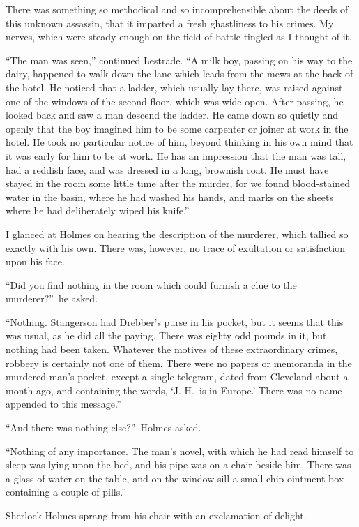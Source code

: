 \documentclass[12pt,english,oneside]{book}
\begin{document}
There was something so methodical and so incomprehensible about the
deeds of this unknown assassin, that it imparted a fresh ghastliness
to his crimes. My nerves, which were steady enough on the field of
battle tingled as I thought of it.

{}``The man was seen,'' continued Lestrade. {}``A milk boy, passing
on his way to the dairy, happened to walk down the lane which leads
from the mews at the back of the hotel. He noticed that a ladder,
which usually lay there, was raised against one of the windows of
the second floor, which was wide open. After passing, he looked back
and saw a man descend the ladder. He came down so quietly and openly
that the boy imagined him to be some carpenter or joiner at work in
the hotel. He took no particular notice of him, beyond thinking in
his own mind that it was early for him to be at work. He has an impression
that the man was tall, had a reddish face, and was dressed in a long,
brownish coat. He must have stayed in the room some little time after
the murder, for we found blood-stained water in the basin, where he
had washed his hands, and marks on the sheets where he had deliberately
wiped his knife.''

I glanced at Holmes on hearing the description of the murderer, which
tallied so exactly with his own. There was, however, no trace of exultation
or satisfaction upon his face.

{}``Did you find nothing in the room which could furnish a clue to
the murderer?''\ he asked.

{}``Nothing. Stangerson had Drebber's purse in his pocket, but it
seems that this was usual, as he did all the paying. There was eighty
odd pounds in it, but nothing had been taken. Whatever the motives
of these extraordinary crimes, robbery is certainly not one of them.
There were no papers or memoranda in the murdered man's pocket, except
a single telegram, dated from Cleveland about a month ago, and containing
the words, `J. H.\ is in Europe.' There was no name appended to this
message.''

{}``And there was nothing else?''\ Holmes asked.

{}``Nothing of any importance. The man's novel, with which he had
read himself to sleep was lying upon the bed, and his pipe was on
a chair beside him. There was a glass of water on the table, and on
the window-sill a small chip ointment box containing a couple of pills.''

Sherlock Holmes sprang from his chair with an exclamation of delight.
\end{document}
